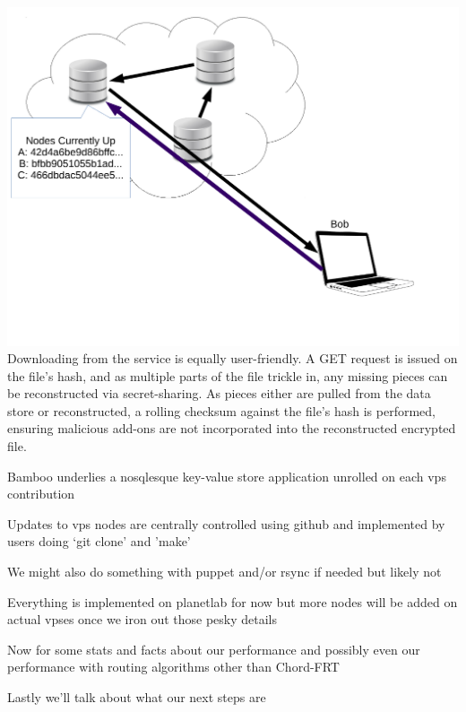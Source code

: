 \begin{center}
    \includegraphics[scale=0.35]{figs/download.pdf}
    \\
    \small{Downloading from the service is equally user-friendly. A GET request is issued on the file's hash, and as multiple parts
    of the file trickle in, any missing pieces can be reconstructed via secret-sharing. As pieces either are pulled from the data store
    or reconstructed, a rolling checksum against the file's hash is performed, ensuring malicious add-ons are not incorporated into the
    reconstructed encrypted file. }
    \\
\end{center}

Bamboo underlies a nosqlesque key-value store application unrolled on each vps contribution

Updates to vps nodes are centrally controlled using github and implemented by users doing `git clone' and 'make'

We might also do something with puppet and/or rsync if needed but likely not

Everything is implemented on planetlab for now but more nodes will be added on actual vpses once we iron out those pesky details

Now for some stats and facts about our performance and possibly even our performance with routing algorithms other than Chord-FRT

Lastly we'll talk about what our next steps are

